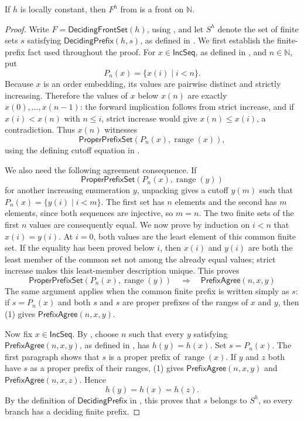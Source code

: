 \begin{lemma}
If $h$ is locally constant, then $F^h$ from  is a
front on $\mathbb N$.
\end{lemma}
\begin{proof}
Write $F=\mathsf{DecidingFrontSet}(h)$, using
, and let $S^h$ denote the set of finite sets $s$
satisfying $\mathsf{DecidingPrefix}(h,s)$, as defined in
.  We first establish the finite-prefix fact used
throughout the proof.  For $x\in\mathsf{IncSeq}$, as defined in
, and $n\in\mathbb N$, put
\[
 P_n(x)=\{x(i)\mid i<n\}.
\]
Because $x$ is an order embedding, its values are pairwise distinct and
strictly increasing.  Therefore the values of $x$ below $x(n)$ are exactly
$x(0),\ldots,x(n-1)$: the forward implication follows from strict increase,
and if $x(i)<x(n)$ with $n\leq i$, strict increase would give
$x(n)\leq x(i)$, a contradiction.  Thus $x(n)$ witnesses
\[
 \mathsf{ProperPrefixSet}(P_n(x),\operatorname{range}(x)),
\]
using the defining cutoff equation in .

We also need the following agreement consequence.  If
\[
 \mathsf{ProperPrefixSet}(P_n(x),\operatorname{range}(y))
\]
for another increasing enumeration $y$, unpacking
 gives a cutoff $y(m)$ such that
$P_n(x)=\{y(i)\mid i<m\}$.  The first set has $n$ elements and the second
has $m$ elements, since both sequences are injective, so $m=n$.  The two
finite sets of the first $n$ values are consequently equal.  We now prove
by induction on $i<n$ that $x(i)=y(i)$.  At $i=0$, both values are the least
element of this common finite set.  If the equality has been proved below
$i$, then $x(i)$ and $y(i)$ are both the least member of the common set not
among the already equal values; strict increase makes this least-member
description unique.  This proves
\[
 \mathsf{ProperPrefixSet}(P_n(x),\operatorname{range}(y))
 \quad\Longrightarrow\quad
 \mathsf{PrefixAgree}(n,x,y)
\tag{1}
\]
The same argument applies when the common finite prefix is written simply
as $s$: if $s=P_n(x)$ and both $s$ and $s$ are proper prefixes of the ranges
of $x$ and $y$, then (1) gives $\mathsf{PrefixAgree}(n,x,y)$.

Now fix $x\in\mathsf{IncSeq}$.  By , choose
$n$ such that every $y$ satisfying
$\mathsf{PrefixAgree}(n,x,y)$, as defined in , has
$h(y)=h(x)$.  Set $s=P_n(x)$.  The first
paragraph shows that $s$ is a proper prefix of $\operatorname{range}(x)$.
If $y$ and $z$ both have $s$ as a proper prefix of their ranges, (1) gives
$\mathsf{PrefixAgree}(n,x,y)$ and
$\mathsf{PrefixAgree}(n,x,z)$.  Hence
\[
 h(y)=h(x)=h(z).
\]
By the definition of $\mathsf{DecidingPrefix}$ in ,
this proves that $s$ belongs to $S^h$, so every branch has a deciding finite
prefix.


\end{proof}
